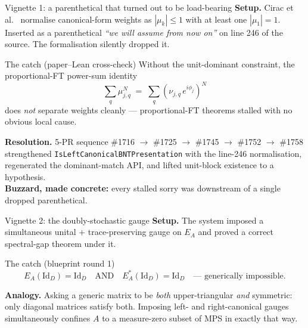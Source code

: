 \documentclass[aspectratio=169,10pt]{beamer}
\newcommand{\Id}{\mathrm{Id}}
\begin{document}
\begin{frame}{Vignette 1: a parenthetical that turned out to be load-bearing}
    \textbf{Setup.} Cirac et al.~\cite{Cirac2017Annals} normalise canonical-form weights as $|\mu_k| \leq 1$ with at least one $|\mu_1| = 1$. Inserted as a parenthetical \emph{``we will assume from now on''} on line 246 of the source. The formalisation silently dropped it.
    \vspace{0.3em}
    \begin{block}{The catch (paper--Lean cross-check)}
        \footnotesize
        Without the unit-dominant constraint, the proportional-FT power-sum identity
        \[
            \sum_q \mu_{j,q}^N \;=\; \sum_q (\nu_{j,q}\, e^{i\phi_j})^N
        \]
        does \emph{not} separate weights cleanly --- proportional-FT theorems stalled with no obvious local cause.
    \end{block}
    \vspace{0.2em}
    \textbf{Resolution.} 5-PR sequence \#1716 $\to$ \#1725 $\to$ \#1745 $\to$ \#1752 $\to$ \#1758 strengthened \texttt{IsLeftCanonicalBNTPresentation} with the line-246 normalisation, regenerated the dominant-match API, and lifted unit-block existence to a hypothesis.
    \\
    \textcolor{amber}{\footnotesize \textbf{Buzzard, made concrete:} every stalled sorry was downstream of a single dropped parenthetical.}
\end{frame}

\begin{frame}{Vignette 2: the doubly-stochastic gauge}
    \textbf{Setup.} The system imposed a simultaneous unital + trace-preserving gauge on $E_A$ and proved a correct spectral-gap theorem under it.
    \vspace{0.3em}
    \begin{block}{The catch (blueprint round 1)}
        \[
            E_A(\Id_D) = \Id_D \quad\text{AND}\quad E_A^*(\Id_D) = \Id_D \quad\text{--- generically impossible.}
        \]
    \end{block}
    \vspace{0.2em}
    \textbf{Analogy.} Asking a generic matrix to be \emph{both} upper-triangular \emph{and} symmetric: only diagonal matrices satisfy both. Imposing left- and right-canonical gauges simultaneously confines $A$ to a measure-zero subset of MPS in exactly that way.
\end{frame}
\end{document}
